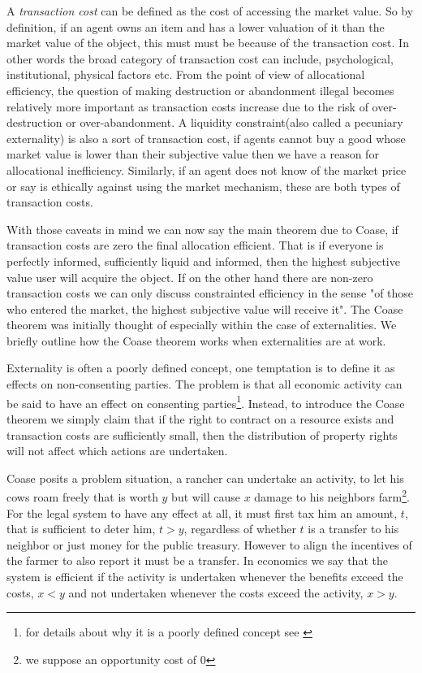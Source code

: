 \documentclass[12pt]{article}
\numberwithin{equation}{section}
\begin{document}
A \textit{transaction cost} can be defined as the cost of accessing the market value. So by definition, if an agent owns an item and has a lower valuation of it than the market value of the object, this must must be because of the transaction cost. In other words the broad category of transaction cost can include, psychological, institutional, physical factors etc. From the point of view of allocational efficiency, the question of making destruction or abandonment illegal becomes relatively more important as transaction costs increase due to the risk of over-destruction or over-abandonment. A liquidity constraint(also called a pecuniary externality) is also a sort of transaction cost, if agents cannot buy a good whose market value is lower than their subjective value then we have a reason for allocational inefficiency. Similarly, if an agent does not know of the market price or say is ethically against using the market mechanism, these are both types of transaction costs.  

With those caveats in mind we can now say the main theorem due to Coase, if transaction costs are zero the final allocation efficient. That is if everyone is perfectly informed, sufficiently liquid and informed, then the highest subjective value user will acquire the object. If on the other hand there are non-zero transaction costs we can only discuss constrainted efficiency in the sense "of those who entered the market, the highest subjective value will receive it". The Coase theorem was initially thought of especially within the case of externalities. We briefly outline how the Coase theorem works when externalities are at work. 

Externality is often a poorly defined concept, one temptation is to define it as effects on non-consenting parties. The problem is that all economic activity can be said to have an effect on consenting parties\footnote{for details about why it is a poorly defined concept see \cite{Cheung1970}}. Instead, to introduce the Coase theorem we simply claim that if the right to contract on a resource exists and transaction costs are sufficiently small, then the distribution of property rights will not affect which actions are undertaken. 

Coase posits a problem situation, a rancher can undertake an activity, to let his cows roam freely that is worth $y$ but will cause $x$ damage to his neighbors farm\footnote{we suppose an opportunity cost of 0}. For the legal system to have any effect at all, it must first tax him an amount, $t$, that is sufficient to deter him, $t>y$, regardless of whether $t$ is a transfer to his neighbor or just money for the public treasury. However to align the incentives of the farmer to also report it must be a transfer. In economics we say that the system is efficient if the activity is undertaken whenever the benefits exceed the costs,  $x<y$ and not undertaken whenever the costs exceed the activity, $x>y$. 
\end{document}
